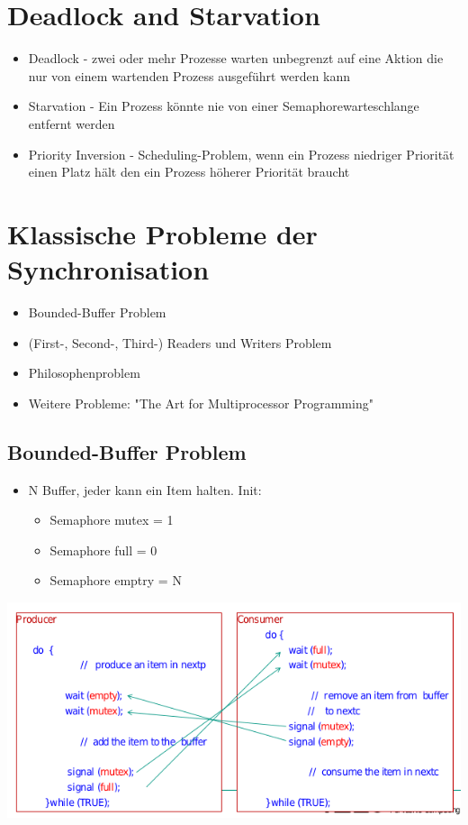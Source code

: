 \documentclass[a4paper]{scrreprt}
\begin{document}
\section{Deadlock and Starvation}
		\begin{itemize}
			\item Deadlock - zwei oder mehr Prozesse warten unbegrenzt auf eine Aktion die nur von einem wartenden Prozess ausgeführt werden kann
			\item Starvation - Ein Prozess könnte nie von einer Semaphorewarteschlange entfernt werden
			\item Priority Inversion - Scheduling-Problem, wenn ein Prozess niedriger Priorität einen Platz hält den ein Prozess höherer Priorität braucht
		\end{itemize}
		
\section{Klassische Probleme der Synchronisation}
		\begin{itemize}
			\item Bounded-Buffer Problem
			\item (First-, Second-, Third-) Readers und Writers Problem
			\item Philosophenproblem
			\item Weitere Probleme: "The Art for Multiprocessor Programming"
		\end{itemize}
		
	\subsection{Bounded-Buffer Problem}
		\begin{itemize}
			\item N Buffer, jeder kann ein Item halten. Init:
				\begin{itemize}
					\item Semaphore mutex = 1
					\item Semaphore full = 0
					\item Semaphore emptry = N
				\end{itemize}
		\end{itemize}
	\includegraphics[scale=0.75]{graphics/boundedbufferprob.png}
	
\end{document}

